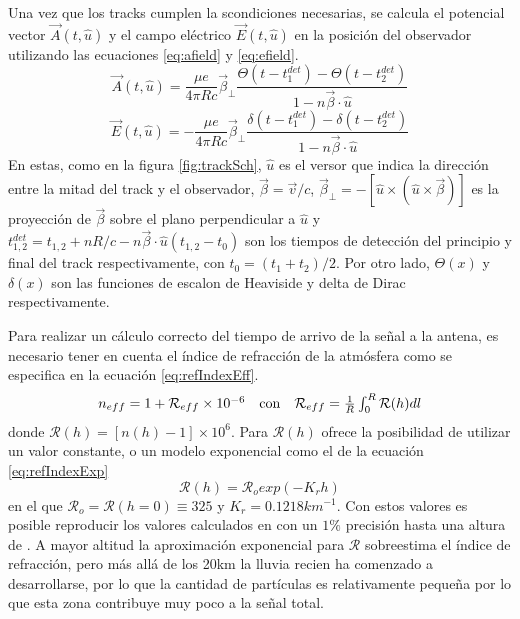 	Una vez que los tracks cumplen la scondiciones necesarias, se calcula el potencial vector $\vec{A}(t,\hat{u})$ y el campo el\'ectrico $\vec{E}(t,\hat{u})$ en la posici\'on del observador utilizando las ecuaciones \ref{eq:afield} y \ref{eq:efield}.
	\begin{equation}
	\vec{A}(t,\hat{u})
	=
	\frac{\mu e}{4\pi Rc}
	\vec\beta_{\bot}
	\frac{\Theta(t-t^{det}_1)-\Theta(t-t^{det}_2)}{1-n\vec\beta\cdot\hat u}
	\label{eq:afield}
	\end{equation}
	\begin{equation}
	\vec{E}(t,\hat{u})
	=
	-\frac{\mu e}{4\pi Rc}
	\vec\beta_{\bot}
	\frac{\delta(t-t^{det}_1)-\delta(t-t^{det}_2)}{1-n\vec\beta\cdot\hat u}
	\label{eq:efield}
	\end{equation}
	En estas, como en la figura \ref{fig:trackSch}, $\hat{u}$ es el versor que indica la direcci\'on entre la mitad del track y el observador, $\vec\beta=\vec v/c$, $\vec\beta_{\bot}=-[\hat{u}\times(\hat{u}\times\vec\beta)]$ es la proyecci\'on de $\vec\beta$ sobre el plano perpendicular a $\hat u$ y $t_{1,2}^{det}=t_{1,2}+nR/c-n\vec\beta \cdot \hat u (t_{1,2}-t_0)$ son los tiempos de detecci\'on del principio y final del track respectivamente, con $t_0=(t_1+t_2)/2$. Por otro lado, $\Theta(x)$ y $\delta(x)$ son las funciones de escalon de Heaviside y delta de Dirac respectivamente.
	
	Para realizar un c\'alculo correcto del tiempo de arrivo de la se\~nal a la antena, es necesario tener en cuenta el \'indice de refracci\'on de la atm\'osfera como se especifica en la ecuaci\'on \ref{eq:refIndexEff}.
	\begin{equation}
		\begin{matrix}
		n_{eff}
		=
		1+{\mathcal R}_{eff}\times10^{-6}
		&
		{\rm con}
		&
		{\mathcal R}_{eff}
		=
		\frac{1}{R}\int_0^R{\mathcal R}(h)dl
		\end{matrix}
	\label{eq:refIndexEff}
	\end{equation}
	donde ${\mathcal R}(h) = \left[ n(h)-1 \right] \times 10^6$.
	Para ${\mathcal R}(h)$ \zhs{} ofrece la posibilidad de utilizar un valor constante, o un modelo exponencial como el de la ecuaci\'on \ref{eq:refIndexExp}
	\begin{equation}
	{\mathcal R}(h)
	=
	{\mathcal R}_o
	exp(-K_rh)
	\label{eq:refIndexExp}
	\end{equation}
	en el que ${\mathcal R}_o={\mathcal R}(h=0)\equiv 325$ y $K_r=0.1218km^{-1}$.
	Con estos valores es posible reproducir los valores calculados en \cite{gerson1948polar} con un $1\%$ precisi\'on hasta una altura de .
	A mayor altitud la aproximaci\'on exponencial para ${\mathcal R}$ sobreestima el \'indice de refracci\'on, pero m\'as all\'a de los 20km la lluvia recien ha comenzado a desarrollarse, por lo que la cantidad de part\'iculas es relativamente peque\~na por lo que esta zona contribuye muy poco a la se\~nal total.
	
